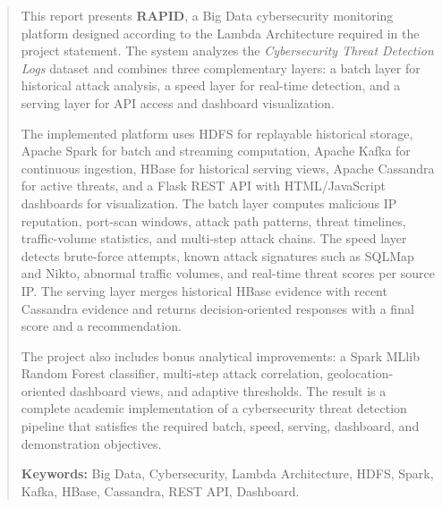 \begin{abstract}
\noindent
This report presents \textbf{RAPID}, a Big Data cybersecurity monitoring platform designed according to the Lambda Architecture required in the project statement. The system analyzes the \textit{Cybersecurity Threat Detection Logs} dataset and combines three complementary layers: a batch layer for historical attack analysis, a speed layer for real-time detection, and a serving layer for API access and dashboard visualization.

The implemented platform uses HDFS for replayable historical storage, Apache Spark for batch and streaming computation, Apache Kafka for continuous ingestion, HBase for historical serving views, Apache Cassandra for active threats, and a Flask REST API with HTML/JavaScript dashboards for visualization. The batch layer computes malicious IP reputation, port-scan windows, attack path patterns, threat timelines, traffic-volume statistics, and multi-step attack chains. The speed layer detects brute-force attempts, known attack signatures such as SQLMap and Nikto, abnormal traffic volumes, and real-time threat scores per source IP. The serving layer merges historical HBase evidence with recent Cassandra evidence and returns decision-oriented responses with a final score and a recommendation.

The project also includes bonus analytical improvements: a Spark MLlib Random Forest classifier, multi-step attack correlation, geolocation-oriented dashboard views, and adaptive thresholds. The result is a complete academic implementation of a cybersecurity threat detection pipeline that satisfies the required batch, speed, serving, dashboard, and demonstration objectives.

\vspace{0.6em}
\noindent
\textbf{Keywords:} Big Data, Cybersecurity, Lambda Architecture, HDFS, Spark, Kafka, HBase, Cassandra, REST API, Dashboard.
\end{abstract}
